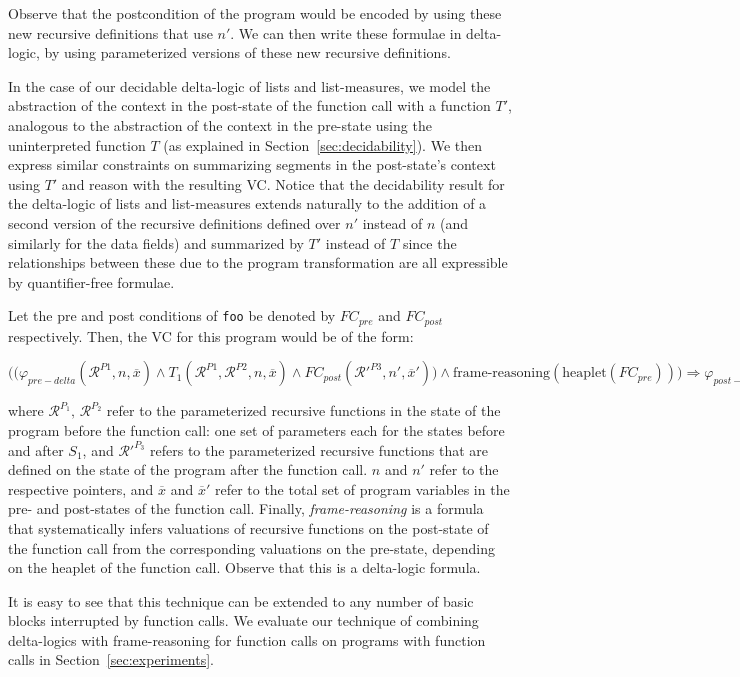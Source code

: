 Observe that the postcondition of the program would be encoded by using these new recursive definitions that use $n'$. We can then write these formulae in delta-logic, by using parameterized versions of these new recursive definitions.

In the case of our decidable delta-logic of lists and list-measures, we model the abstraction of the context in the post-state of the function call with a function $T'$, analogous to the abstraction of the context in the pre-state using the uninterpreted function $T$ (as explained in Section~\ref{sec:decidability}). We then express similar constraints on summarizing segments in the post-state's context using $T'$ and reason with the resulting VC. Notice that the decidability result for the delta-logic of lists and list-measures extends naturally to the addition of a second version of the recursive definitions defined over $n'$ instead of $n$ (and similarly for the data fields) and summarized by $T'$ instead of $T$ since the relationships between these due to the program transformation are all expressible by quantifier-free formulae. 

Let the pre and post conditions of \texttt{foo} be denoted by $FC_{pre}$ and $FC_{post}$ respectively. Then, the VC for this program would be of the form:\\
\begin{center}
 $\Big(\big( \varphi_{pre-delta}(\mathcal{R}^{P1}, n, \overline{x}) \land{} T_1(\mathcal{R}^{P1},\mathcal{R}^{P2}, n, \overline{x}) \land{} FC_{post}(\mathcal{R'}^{P3}, n', \overline{x}') \big) \land{} \textrm{frame-reasoning}(\textrm{heaplet}(FC_{pre})) \Big) \Rightarrow{} \varphi_{post-delta}(\mathcal{R'}^{P3}, n', \overline{x}')$ 
\end{center}
where $\mathcal{R}^{P_1},\, \mathcal{R}^{P_2}$ refer to the parameterized recursive functions in the state of the program before the function call: one set of parameters each for the states before and after $S_1$, and $\mathcal{R'}^{P_3}$ refers to the parameterized recursive functions that are defined on the state of the program after the function call. $n$ and $n'$ refer to the respective pointers, and $\overline{x}$ and $\overline{x}'$ refer to the total set of program variables in the pre- and post-states of the function call. Finally, \textit{frame-reasoning} is a formula that systematically infers valuations of recursive functions on the post-state of the function call from the corresponding valuations on the pre-state, depending on the heaplet of the function call. Observe that this is a delta-logic formula.

It is easy to see that this technique can be extended to any number of basic blocks interrupted by function calls. We evaluate our technique of combining delta-logics with frame-reasoning for function calls on programs with function calls in Section~\ref{sec:experiments}.
